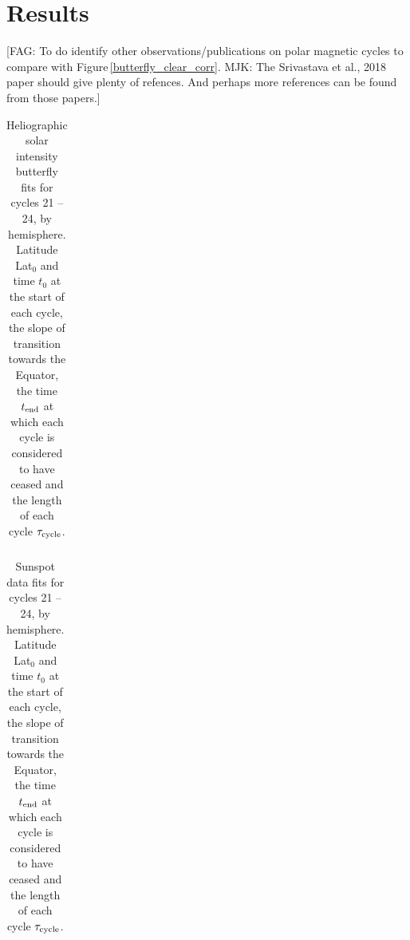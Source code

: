 \documentclass{aa}
\newcommand{\fag}[1]{\textcolor{midpurple}{[FAG: #1]}} %
\begin{document}




\section{Results}
\fag{To do identify other observations/publications on polar magnetic cycles to compare with
Figure\,\ref{butterfly_clear_corr}. MJK: The Srivastava et al., 2018 paper should give plenty of refences. And perhaps more references can be found from those papers.}\\

\begin{table}
\caption{\label{tab:cycles}
Heliographic solar intensity butterfly fits for cycles 21 -- 24, by hemisphere.
Latitude Lat$_0$ and time $t_0$ at the start of each cycle, the slope of transition
towards the Equator, the time $t_{\rm end}$ at which each cycle is considered to have
ceased and the length of each cycle $\tau_{\rm cycle}$.
}
\begin{tabular}{l|ccccr}
\hline\hline

\hline
\end{tabular}
\end{table}

\begin{table}
\caption{\label{tab:cycles_sunspot}
Sunspot data fits for cycles 21 -- 24, by hemisphere.
Latitude Lat$_0$ and time $t_0$ at the start of each cycle, the slope of transition
towards the Equator, the time $t_{\rm end}$ at which each cycle is considered to have
ceased and the length of each cycle $\tau_{\rm cycle}$.
}
\begin{tabular}{l|ccccr}
\hline\hline

\hline
\end{tabular}
\end{table}
\end{document}
